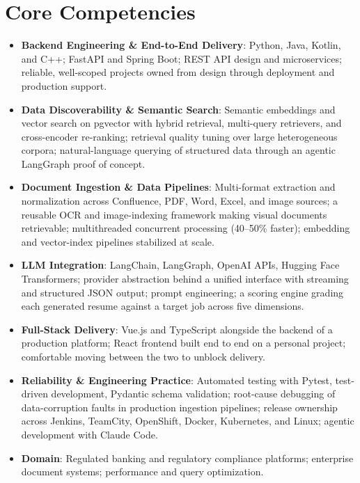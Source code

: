 \documentclass[11pt,a4paper,sans]{moderncv}
\begin{document}
\section{Core Competencies}
\vspace{1pt}
\begin{itemize}

\item \textbf{Backend Engineering \& End-to-End Delivery}: Python, Java, Kotlin, and C++; FastAPI and Spring Boot; REST API design and microservices; reliable, well-scoped projects owned from design through deployment and production support.

\item \textbf{Data Discoverability \& Semantic Search}: Semantic embeddings and vector search on pgvector with hybrid retrieval, multi-query retrievers, and cross-encoder re-ranking; retrieval quality tuning over large heterogeneous corpora; natural-language querying of structured data through an agentic LangGraph proof of concept.

\item \textbf{Document Ingestion \& Data Pipelines}: Multi-format extraction and normalization across Confluence, PDF, Word, Excel, and image sources; a reusable OCR and image-indexing framework making visual documents retrievable; multithreaded concurrent processing (40--50\% faster); embedding and vector-index pipelines stabilized at scale.

\item \textbf{LLM Integration}: LangChain, LangGraph, OpenAI APIs, Hugging Face Transformers; provider abstraction behind a unified interface with streaming and structured JSON output; prompt engineering; a scoring engine grading each generated resume against a target job across five dimensions.

\item \textbf{Full-Stack Delivery}: Vue.js and TypeScript alongside the backend of a production platform; React frontend built end to end on a personal project; comfortable moving between the two to unblock delivery.

\item \textbf{Reliability \& Engineering Practice}: Automated testing with Pytest, test-driven development, Pydantic schema validation; root-cause debugging of data-corruption faults in production ingestion pipelines; release ownership across Jenkins, TeamCity, OpenShift, Docker, Kubernetes, and Linux; agentic development with Claude Code.

\item \textbf{Domain}: Regulated banking and regulatory compliance platforms; enterprise document systems; performance and query optimization.

\end{itemize}
\end{document}
